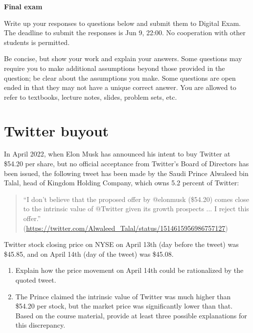 \documentclass[a4paper]{article}
\newif\ifsolutions
\begin{document}
{\ifsolutions \else	
	
\fi}

\begin{center}
		\LARGE\textbf{Final exam {\ifsolutions solutions \fi}}
\end{center}

{\ifsolutions \else	
Write up your responses to questions below and submit them to Digital Exam. The deadline to submit the responses is Jun 9, 22:00. No cooperation with other students is permitted.

Be concise, but show your work and explain your answers. Some questions may require you to make additional assumptions beyond those provided in the question; be clear about the assumptions you make. Some questions are open ended in that they may not have a unique correct answer. You are allowed to refer to textbooks, lecture notes, slides, problem sets, etc.
\fi}



\section{Twitter buyout}
In April 2022, when Elon Musk has announced his intent to buy Twitter at \$54.20 per share, but no official acceptance from Twitter's Board of Directors has been issued, the following tweet has been made by the Saudi Prince Alwaleed bin Talal, head of Kingdom Holding Company, which owns 5.2 percent of Twitter:
\begin{quote}
``I don't believe that the proposed offer by @elonmusk (\$54.20) comes close to the intrinsic value of @Twitter given its growth prospects ... I reject this offer.''
\\ (\url{https://twitter.com/Alwaleed_Talal/status/1514615956986757127})
\end{quote}

Twitter stock closing price on NYSE on April 13th (day before the tweet) was \$45.85, and on April 14th (day of the tweet) was \$45.08.

\begin{enumerate}
	\item Explain how the price movement on April 14th could be rationalized by the quoted tweet.
	
	\item The Prince claimed the intrinsic value of Twitter was much higher than \$54.20 per stock, but the market price was significantly lower than that. Based on the course material, provide at least three possible explanations for this discrepancy.
\end{enumerate}
\end{document}
